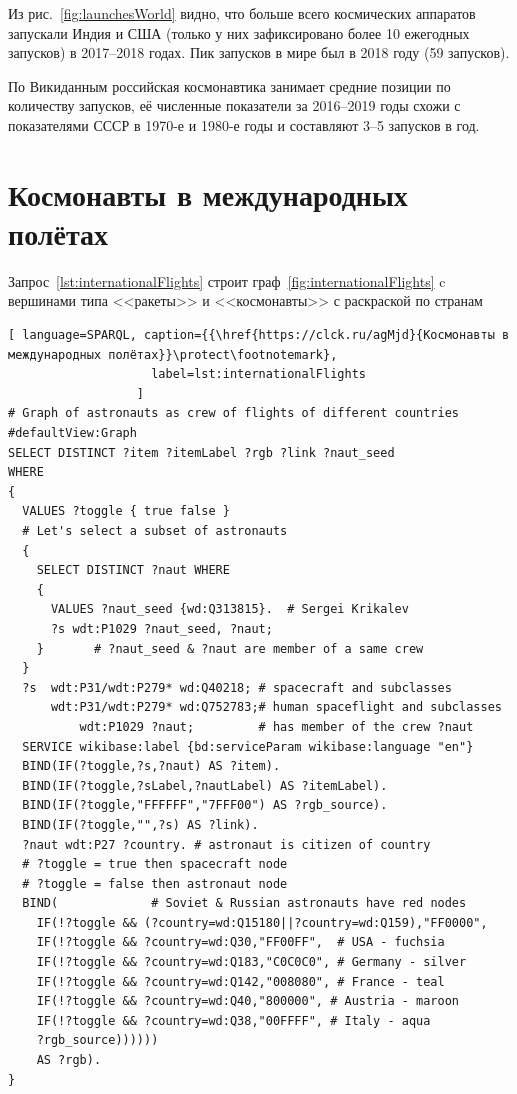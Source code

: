 Из рис.~\ref{fig:launchesWorld} видно, что больше всего космических аппаратов 
запускали Индия и США 
(только у них зафиксировано более 10 ежегодных запусков) в 2017--2018 годах. 
Пик запусков в мире был в 2018 году (59 запусков). 

По Викиданным российская космонавтика занимает средние позиции по количеству запусков, 
её численные показатели за 2016--2019 годы схожи с показателями СССР в 1970-е и 1980-е годы 
и составляют 3--5 запусков в год.

\section{Космонавты в международных полётах}

Запрос~\ref{lst:internationalFlights} строит граф~\ref{fig:internationalFlights} c вершинами типа <<ракеты>> и <<космонавты>> с раскраской по странам

\begin{lstlisting}[ language=SPARQL, caption={{\href{https://clck.ru/agMjd}{Космонавты в международных полётах}}\protect\footnotemark}, 
                    label=lst:internationalFlights
                  ]
# Graph of astronauts as crew of flights of different countries
#defaultView:Graph
SELECT DISTINCT ?item ?itemLabel ?rgb ?link ?naut_seed
WHERE
{ 
  VALUES ?toggle { true false }
  # Let's select a subset of astronauts
  {
    SELECT DISTINCT ?naut WHERE
    { 
      VALUES ?naut_seed {wd:Q313815}.  # Sergei Krikalev
      ?s wdt:P1029 ?naut_seed, ?naut;  
    }       # ?naut_seed & ?naut are member of a same crew
  }
  ?s  wdt:P31/wdt:P279* wd:Q40218; # spacecraft and subclasses
      wdt:P31/wdt:P279* wd:Q752783;# human spaceflight and subclasses
          wdt:P1029 ?naut;         # has member of the crew ?naut    
  SERVICE wikibase:label {bd:serviceParam wikibase:language "en"}
  BIND(IF(?toggle,?s,?naut) AS ?item).
  BIND(IF(?toggle,?sLabel,?nautLabel) AS ?itemLabel).
  BIND(IF(?toggle,"FFFFFF","7FFF00") AS ?rgb_source).
  BIND(IF(?toggle,"",?s) AS ?link).
  ?naut wdt:P27 ?country. # astronaut is citizen of country 
  # ?toggle = true then spacecraft node
  # ?toggle = false then astronaut node
  BIND(             # Soviet & Russian astronauts have red nodes
    IF(!?toggle && (?country=wd:Q15180||?country=wd:Q159),"FF0000",
    IF(!?toggle && ?country=wd:Q30,"FF00FF",  # USA - fuchsia
    IF(!?toggle && ?country=wd:Q183,"C0C0C0", # Germany - silver
    IF(!?toggle && ?country=wd:Q142,"008080", # France - teal
    IF(!?toggle && ?country=wd:Q40,"800000", # Austria - maroon
    IF(!?toggle && ?country=wd:Q38,"00FFFF", # Italy - aqua
    ?rgb_source))))))
    AS ?rgb).
}
\end{lstlisting}

